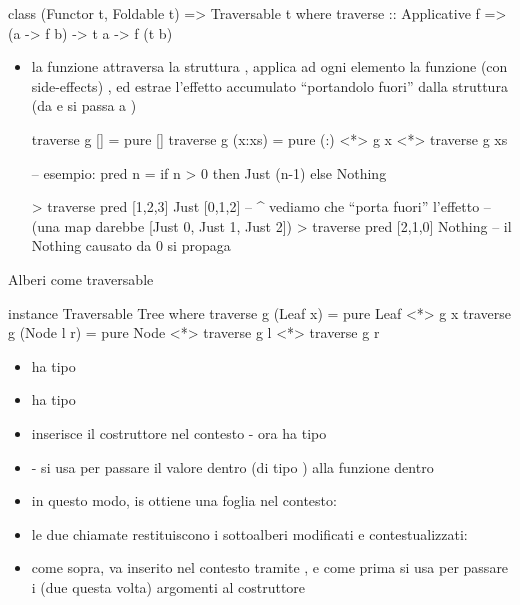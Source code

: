 \begin{haskellbox}{}
class (Functor t, Foldable t) => Traversable t where
    traverse :: Applicative f => (a -> f b) -> t a -> f (t b)
\end{haskellbox}
\begin{itemize}
    \item la funzione  attraversa la struttura , applica ad ogni elemento la funzione (con side-effects) , ed estrae l'effetto accumulato ``portandolo fuori'' dalla struttura (da  e  si passa a )

        \begin{haskellbox}{}
traverse g [] = pure []
traverse g (x:xs) = pure (:) <*> g x <*> traverse g xs

-- esempio:
pred n = if n > 0 then Just (n-1) else Nothing

> traverse pred [1,2,3]
Just [0,1,2]
-- ^ vediamo che ``porta fuori'' l'effetto
-- (una map darebbe [Just 0, Just 1, Just 2])
> traverse pred [2,1,0]
Nothing -- il Nothing causato da 0 si propaga
        \end{haskellbox}
\end{itemize}

\begin{gframe}{Alberi come traversable}
    \begin{haskellbox}{}
instance Traversable Tree where
traverse g (Leaf x) = pure Leaf <*> g x
traverse g (Node l r) = pure Node <*> traverse g l <*> traverse g r
\end{haskellbox}

\begin{itemize}
    \item {} ha tipo 
    \item {} ha tipo 
    \item {} inserisce il costruttore  nel contesto - ora ha tipo 
    \item {} - si usa \code{<*>} per passare il valore dentro  (di tipo ) alla funzione dentro  
    \item in questo modo, is ottiene una foglia nel contesto: 
\end{itemize}


\begin{itemize}
    \item le due chiamate  restituiscono i sottoalberi modificati e contestualizzati: 
    \item come sopra,  va inserito nel contesto tramite , e come prima si usa \code{<*>} per passare i (due questa volta) argomenti al costruttore
\end{itemize}

\end{gframe}

